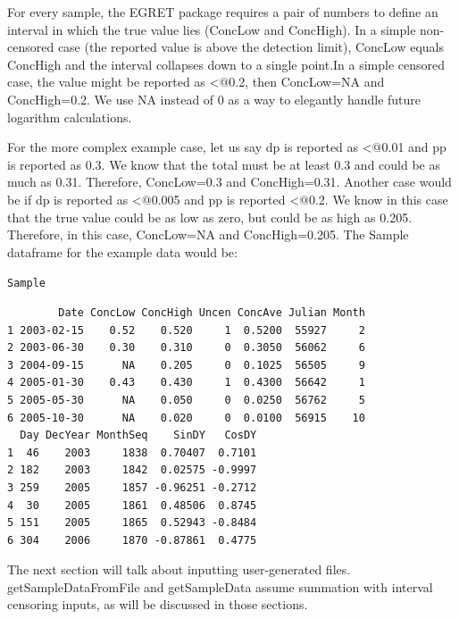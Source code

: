 \documentclass[a4paper,11pt]{article}\usepackage[]{graphicx}\usepackage[]{color}
\makeatletter
\newcommand{\hlstd}[1]{\textcolor[rgb]{0.345,0.345,0.345}{#1}}%
\newenvironment{kframe}{%
 \def\at@end@of@kframe{}%
 \ifinner\ifhmode%
  \def\at@end@of@kframe{\end{minipage}}%
  \begin{minipage}{\columnwidth}%
 \fi\fi%
 \def\FrameCommand##1{\hskip\@totalleftmargin \hskip-\fboxsep
 \colorbox{shadecolor}{##1}\hskip-\fboxsep
     \hskip-\linewidth \hskip-\@totalleftmargin \hskip\columnwidth}%
 \MakeFramed {\advance\hsize-\width
   \@totalleftmargin\z@ \linewidth\hsize
   \@setminipage}}%
 {\par\unskip\endMakeFramed%
 \at@end@of@kframe}
\newenvironment{knitrout}{}{} %
\makeatother
\begin{document}
For every sample, the EGRET package requires a pair of numbers to define an interval in which the true value lies (ConcLow and ConcHigh). In a simple non-censored case (the reported value is above the detection limit), ConcLow equals ConcHigh and the interval collapses down to a single point.In a simple censored case, the value might be reported as \verb@<@0.2, then ConcLow=NA and ConcHigh=0.2. We use NA instead of 0 as a way to elegantly handle future logarithm calculations.

For the more complex example case, let us say dp is reported as \verb@<@0.01 and pp is reported as 0.3. We know that the total must be at least 0.3 and could be as much as 0.31. Therefore, ConcLow=0.3 and ConcHigh=0.31. Another case would be if dp is reported as \verb@<@0.005 and pp is reported \verb@<@0.2. We know in this case that the true value could be as low as zero, but could be as high as 0.205. Therefore, in this case, ConcLow=NA and ConcHigh=0.205. The Sample dataframe for the example data would be:




\begin{knitrout}
\color{fgcolor}\begin{kframe}
\begin{alltt}
  \hlstd{Sample}
\end{alltt}
\begin{verbatim}
        Date ConcLow ConcHigh Uncen ConcAve Julian Month
1 2003-02-15    0.52    0.520     1  0.5200  55927     2
2 2003-06-30    0.30    0.310     0  0.3050  56062     6
3 2004-09-15      NA    0.205     0  0.1025  56505     9
4 2005-01-30    0.43    0.430     1  0.4300  56642     1
5 2005-05-30      NA    0.050     0  0.0250  56762     5
6 2005-10-30      NA    0.020     0  0.0100  56915    10
  Day DecYear MonthSeq    SinDY   CosDY
1  46    2003     1838  0.70407  0.7101
2 182    2003     1842  0.02575 -0.9997
3 259    2005     1857 -0.96251 -0.2712
4  30    2005     1861  0.48506  0.8745
5 151    2005     1865  0.52943 -0.8484
6 304    2006     1870 -0.87861  0.4775
\end{verbatim}
\end{kframe}
\end{knitrout}


The next section will talk about inputting user-generated files. getSampleDataFromFile and getSampleData assume summation with interval censoring inputs, as will be discussed in those sections.

\FloatBarrier
\end{document}
